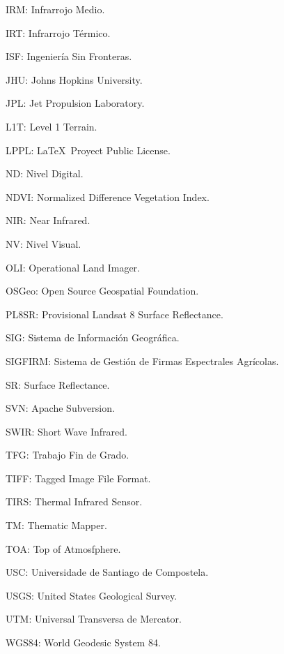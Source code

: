 IRM: Infrarrojo Medio.

IRT: Infrarrojo Térmico.

ISF: Ingeniería Sin Fronteras.

JHU: Johns Hopkins University.

JPL: Jet Propulsion Laboratory.

L1T: Level 1 Terrain.

LPPL: \LaTeX\ Proyect Public License.

ND: Nivel Digital.

NDVI: Normalized Difference Vegetation Index.

NIR: Near Infrared.

NV: Nivel Visual.

OLI: Operational Land Imager.

OSGeo: Open Source Geospatial Foundation.

PL8SR: Provisional Landsat 8 Surface Reflectance.

SIG: Sistema de Información Geográfica.

SIGFIRM: Sistema de Gestión de Firmas Espectrales Agrícolas.

SR: Surface Reflectance.

SVN: Apache Subversion.

SWIR: Short Wave Infrared.

TFG: Trabajo Fin de Grado.

TIFF: Tagged Image File Format.

TIRS: Thermal Infrared Sensor.

TM: Thematic Mapper.

TOA: Top of Atmosfphere.

USC: Universidade de Santiago de Compostela.

USGS: United States Geological Survey.

UTM: Universal Transversa de Mercator.

WGS84: World Geodesic System 84.